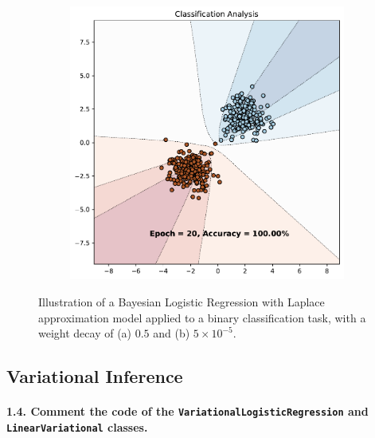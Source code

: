 \begin{figure}[H]
\begin{subfigure}{0.45\textwidth}
        \includegraphics[width=\textwidth]{laplace_approx_5e-05.pdf}
        \caption{}
        \label{subfig:weight_decay_low}
    \end{subfigure}%
    \caption{Illustration of a Bayesian Logistic Regression with Laplace approximation model applied to a binary classification task, with a weight decay of (a) $0.5$ and (b) $5 \times 10^{-5}$.}
    \label{fig:weight_decay}
\end{figure}

\subsection{Variational Inference}
\paragraph{1.4. Comment the code of the \texttt{VariationalLogisticRegression} and \texttt{LinearVariational} classes.}

